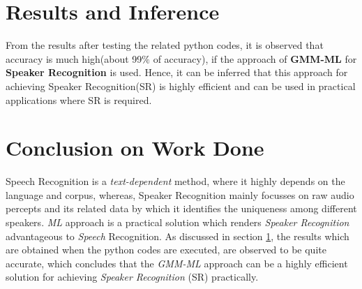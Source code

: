 \documentclass{article}
\begin{document}
\section{\textbf{{Results and Inference}}} \label{result}
From the results after testing the related python codes, it is observed that accuracy is much high(about 99$\%$ of accuracy), if the approach of \textbf{GMM-ML} for \textbf{Speaker Recognition} is used. Hence, it can be inferred that this approach for achieving Speaker Recognition(SR) is highly efficient and can be used in practical applications where SR is required.

\section{\textbf{{Conclusion on Work Done}}}
Speech Recognition is a \textit{text-dependent} method, where it highly depends on the language and corpus, whereas, Speaker Recognition mainly focusses on raw audio percepts and its related data by which it identifies the uniqueness among different speakers. \textit{ML} approach is a practical solution which renders \textit{Speaker Recognition} advantageous to \textit{Speech} Recognition. 
As discussed in section \ref{result}, the results which are obtained when the python codes are executed, are observed to be quite accurate, which concludes that the \textit{GMM-ML} approach can be a highly efficient solution for achieving \textit{Speaker Recognition }(SR) practically.
\end{document}
